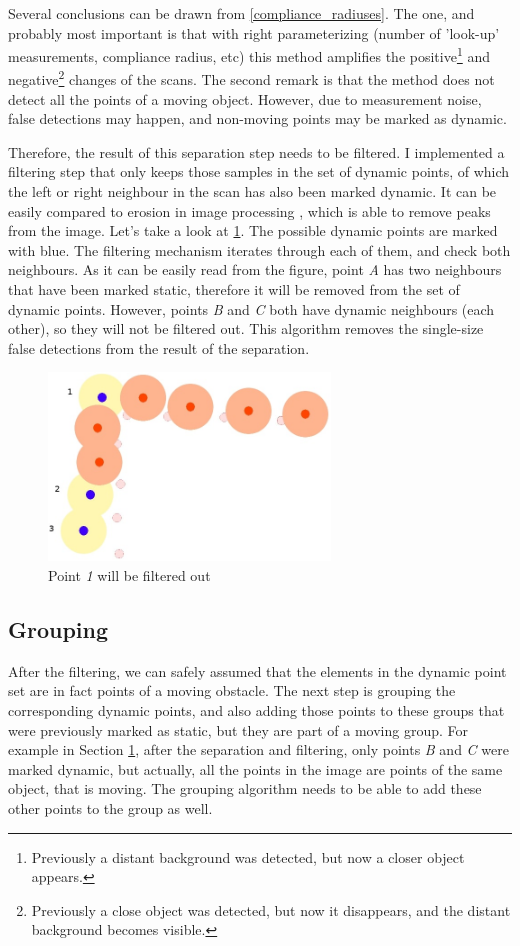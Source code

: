 Several conclusions can be drawn from \ref{compliance_radiuses}. The one, and probably most important is that with right parameterizing (number of 'look-up' measurements, compliance radius, etc) this method amplifies the positive\footnote{Previously a distant background was detected, but now a closer object appears.} and negative\footnote{Previously a close object was detected, but now it disappears, and the distant background becomes visible.} changes of the scans. The second remark is that the method does not detect all the points of a moving object. However, due to measurement noise, false detections may happen, and non-moving points may be marked as dynamic.

Therefore, the result of this separation step needs to be filtered. I implemented a filtering step that only keeps those samples in the set of dynamic points, of which the left or right neighbour in the scan has also been marked dynamic. It can be easily compared to erosion in image processing \cite{wiki_erosion}, which is able to remove peaks from the image. Let's take a look at \ref{dynamic_points}. The possible dynamic points are marked with blue. The filtering mechanism iterates through each of them, and check both neighbours. As it can be easily read from the figure, point \textit{A} has two neighbours that have been marked static, therefore it will be removed from the set of dynamic points. However, points \textit{B} and \textit{C} both have dynamic neighbours (each other), so they will not be filtered out. This algorithm removes the single-size false detections from the result of the separation.

\begin{figure}[!ht]
    \centering
    \includegraphics[height=50mm]{figures/raw/jpeg/dynamic_points.jpg}
    \caption{Point \textit{1} will be filtered out}
    \label{dynamic_points}
\end{figure}

\subsection{Grouping}
After the filtering, we can safely assumed that the elements in the dynamic point set are in fact points of a moving obstacle. The next step is grouping the corresponding dynamic points, and also adding those points to these groups that were previously marked as static, but they are part of a moving group. For example in Section \ref{dynamic_points}, after the separation and filtering, only points \textit{B} and \textit{C} were marked dynamic, but actually, all the points in the image are points of the same object, that is moving. The grouping algorithm needs to be able to add these other points to the group as well.

